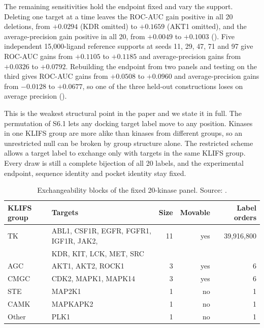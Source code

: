 The remaining sensitivities hold the endpoint fixed and vary the support. Deleting one target at
a time leaves the ROC-AUC gain positive in all 20 deletions, from $+0.0294$ (KDR omitted) to
$+0.1659$ (AKT1 omitted), and the average-precision gain positive in all 20, from $+0.0049$ to
$+0.1003$ (). Five independent
15{,}000-ligand reference supports at seeds 11, 29, 47, 71 and 97 give ROC-AUC gains from
$+0.1105$ to $+0.1185$ and average-precision gains from $+0.0326$ to $+0.0792$. Rebuilding the
endpoint from two panels and testing on the third gives ROC-AUC gains from $+0.0508$ to $+0.0960$
and average-precision gains from $-0.0128$ to $+0.0677$, so one of the three held-out
constructions loses on average precision
().


This is the weakest structural point in the paper and we state it in full. The permutation of
S6.1 lets any docking target label move to any position. Kinases in one KLIFS group are more
alike than kinases from different groups, so an unrestricted null can be broken by group
structure alone. The restricted scheme allows a target label to exchange only with targets in the
same KLIFS group. Every draw is still a complete bijection of all 20 labels, and the experimental
endpoint, sequence identity and pocket identity stay fixed.

\begin{table}[htbp]
\centering
\small
\caption[Exchangeability blocks of the fixed 20-kinase panel]{Exchangeability blocks of the fixed 20-kinase panel. Source:
.}
\label{tab:s6-blocks}
\begin{tabular}{llrrr}
\toprule
KLIFS group & Targets & Size & Movable & Label orders \\
\midrule
TK    & ABL1, CSF1R, EGFR, FGFR1, IGF1R, JAK2, & 11 & yes & 39{,}916{,}800 \\
      & KDR, KIT, LCK, MET, SRC & & & \\
AGC   & AKT1, AKT2, ROCK1 & 3 & yes & 6 \\
CMGC  & CDK2, MAPK1, MAPK14 & 3 & yes & 6 \\
STE   & MAP2K1 & 1 & no & 1 \\
CAMK  & MAPKAPK2 & 1 & no & 1 \\
Other & PLK1 & 1 & no & 1 \\
\bottomrule
\end{tabular}
\end{table}

